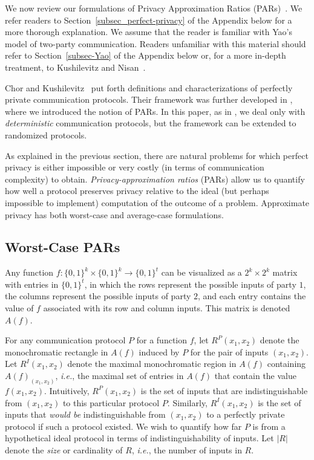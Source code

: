 \documentclass{article}
\theoremstyle{theorem}
\theoremstyle{definition}
\theoremstyle{remark}
\newcommand{\ie}{\emph{i.e.}}
\begin{document}
We now review our formulations of Privacy Approximation Ratios (PARs)~\cite{fjs09tr14}.
We refer readers to Section~\ref{subsec_perfect-privacy} of the Appendix below for a more
thorough explanation. We assume that the reader is familiar with Yao's model of two-party
communication. Readers unfamiliar with this material should refer to Section~\ref{subsec-Yao}
of the Appendix below or, for a more in-depth treatment, to Kushilevitz and Nisan~\cite{KN97}.

Chor and Kushilevitz~\cite{CK91,K92} put forth definitions and characterizations of perfectly
private communication protocols. Their framework was further developed in \cite{fjs09tr14},
where we introduced the notion of PARs. In this paper, as in \cite{fjs09tr14}, we deal only
with \emph{deterministic} communication protocols, but the framework can be extended to randomized
protocols.

As explained in the previous section, there are natural problems for which
perfect privacy is either impossible or very costly (in terms of communication complexity) to obtain.
\emph{Privacy-approximation ratios} (PARs) allow us to quantify how
well a protocol preserves privacy relative to the ideal (but perhaps impossible to implement)
computation of the outcome of a problem.  Approximate privacy has both worst-case and average-case
formulations.

\subsection{Worst-Case PARs}\label{ssec:par-wc}

Any function $f:\{0,1\}^k\times \{0,1\}^k\rightarrow\{0,1\}^t$ can
be visualized as a $2^k\times 2^k$ matrix with entries in
$\{0,1\}^t$, in which the rows represent the possible inputs of
party $1$, the columns represent the possible inputs of party $2$,
and each entry contains the value of $f$ associated with its row and
column inputs. This matrix is denoted $A(f)$.

For any communication protocol $P$ for a function $f$, let
$R^P(x_1,x_2)$ denote the monochromatic rectangle in $A(f)$ induced by $P$ for the pair
of inputs $(x_1,x_2)$. Let $R^I(x_1,x_2)$ denote the maximal monochromatic region in $A(f)$
containing $A(f)_{(x_1,x_2)}$, \emph{i.e.}, the maximal set of entries in $A(f)$ that contain
the value $f(x_1,x_2)$. Intuitively, $R^P(x_1,x_2)$ is the set
of inputs that are indistinguishable from $(x_1,x_2)$ to this particular protocol $P$.
Similarly, $R^I(x_1,x_2)$ is the set
of inputs that \emph{would be} indistinguishable from $(x_1,x_2)$ to a
perfectly private protocol if such a protocol existed.
We wish to quantify how far $P$ is from a hypothetical ideal protocol in
terms of indistinguishability of inputs. Let $|R|$ denote the \emph{size} or
cardinality of $R$, \ie, the number of inputs in $R$.
\end{document}
